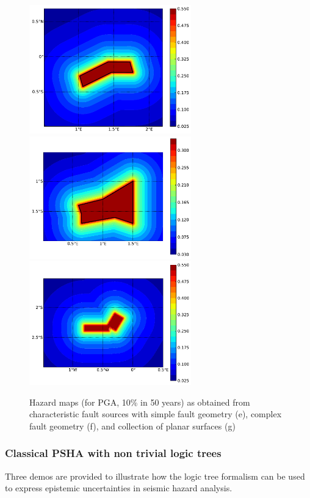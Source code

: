 \begin{figure} 
\centering 
\subcaptionbox{}
{\includegraphics[width=7cm]{./figures/hazard/char_fault2.pdf}} 
\subcaptionbox{}
{\includegraphics[width=7cm]{./figures/hazard/char_fault3.pdf}} 
\subcaptionbox{}
{\includegraphics[width=7cm]{./figures/hazard/char_fault1.pdf}} 
\caption{Hazard maps (for PGA, 10\% in 50 years) as obtained from 
    characteristic fault sources with simple fault
    geometry (e), complex fault geometry (f), and collection of 
    planar surfaces (g)}
\label{fig:hazard_maps2}
\end{figure}

\clearpage
\subsubsection{Classical PSHA with non trivial logic trees}
Three demos are provided to illustrate how the logic tree formalism can 
be used to express epistemic uncertainties in seismic hazard analysis.\\

